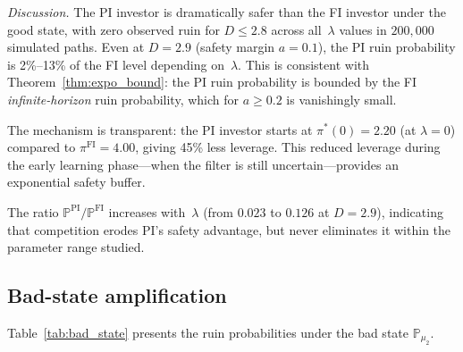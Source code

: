 \documentclass[12pt]{article}
\theoremstyle{remark}
\theoremstyle{definition}
\newcommand{\Prob}{\mathbb{P}}
\newcommand{\FI}{\mathrm{FI}}
\newcommand{\PI}{\mathrm{PI}}
\begin{document}
\emph{Discussion.}
The PI investor is dramatically safer than the FI investor under the
good state, with zero observed ruin for $D \le 2.8$ across all~$\lambda$
values in $200{,}000$ simulated paths.
Even at $D = 2.9$ (safety margin $a = 0.1$), the PI ruin probability is
2\%--13\% of the FI level depending on~$\lambda$.
This is consistent with Theorem~\ref{thm:expo_bound}:
the PI ruin probability is bounded by the FI \emph{infinite-horizon}
ruin probability, which for $a \ge 0.2$ is vanishingly small.

The mechanism is transparent: the PI investor starts at
$\pi^*(0) = 2.20$ (at $\lambda = 0$) compared to $\pi^{\FI} = 4.00$,
giving 45\% less leverage.
This reduced leverage during the early learning phase---when the filter
is still uncertain---provides an exponential safety buffer.

The ratio $\Prob^{\PI}/\Prob^{\FI}$ increases with~$\lambda$
(from $0.023$ to $0.126$ at $D = 2.9$), indicating that competition
erodes PI's safety advantage, but never eliminates it within the
parameter range studied.


\subsection{Bad-state amplification}\label{sec:num_bad}

Table~\ref{tab:bad_state} presents the ruin probabilities under the bad
state $\Prob_{\mu_2}$.
\end{document}

